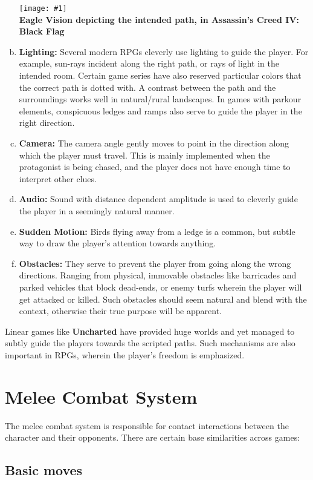 \documentclass[12pt]{article}
\newcommand{\point}[1]{\item \textbf{#1:}}
\newcommand{\fig}[3]{\begin{center} \texttt{[image: \#1]}\\ \textbf{#3} \end{center}}
\begin{document}
\begin{enumerate}[a)]
\fig{ac_eagle_vision}{0.3}{Eagle Vision depicting the intended path, in Assassin's Creed IV: Black Flag} 

\point{Lighting} Several modern RPGs cleverly use lighting to guide the player. For example, sun-rays incident along the right path, or rays of light in the intended room. Certain game series have also reserved particular colors that the correct path is dotted with. A contrast between the path and the surroundings works well in natural/rural landscapes. In games with parkour elements, conspicuous ledges and ramps also serve to guide the player in the right direction.

\point{Camera} The camera angle gently moves to point in the direction along which the player must travel. This is mainly implemented when the protagonist is being chased, and the player does not have enough time to interpret other clues.

\point{Audio} Sound with distance dependent amplitude is used to cleverly guide the player in a seemingly natural manner. 

\point{Sudden Motion} Birds flying away from a ledge is a common, but subtle way to draw the player's attention towards anything.

\point{Obstacles} They serve to prevent the player from going along the wrong directions. Ranging from physical, immovable obstacles like barricades and parked vehicles that block dead-ends, or enemy turfs wherein the player will get attacked or killed. Such obstacles should seem natural and blend with the context, otherwise their true purpose will be apparent.

\end{enumerate}

Linear games like \textbf{Uncharted} have provided huge worlds and yet managed to subtly guide the players towards the scripted paths. Such mechanisms are also important in RPGs, wherein the player's freedom is emphasized.

\section{Melee Combat System}

The melee combat system is responsible for contact interactions between the character and their opponents. There are certain base similarities across games:

\subsection{Basic moves}
\end{document}
